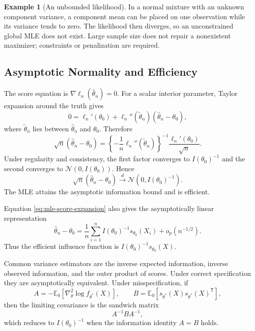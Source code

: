 \documentclass[12pt,oneside]{book}
\numberwithin{equation}{section}
\theoremstyle{definition}
\newtheorem{example}{Example}[section]
\theoremstyle{plain}
\theoremstyle{remark}
\newcommand{\E}{\mathbb{E}}
\newcommand{\convd}{\overset{d}{\to}}
\newcommand{\grad}{\nabla}
\newcommand{\Hess}{\nabla^2}
\newcommand{\Normal}{\mathcal{N}}
\begin{document}
\begin{example}[An unbounded likelihood]
In a normal mixture with an unknown component variance, a component mean can
be placed on one observation while its variance tends to zero.  The
likelihood then diverges, so an unconstrained global MLE does not exist.
Large sample size does not repair a nonexistent maximizer; constraints or
penalization are required.
\end{example}

\subsection{Asymptotic Normality and Efficiency}

The score equation is $\grad\ell_n(\widehat\theta_n)=0$.  For a scalar
interior parameter, Taylor expansion around the truth gives
\[
 0=\ell_n'(\theta_0)
   +\ell_n''(\widetilde\theta_n)(\widehat\theta_n-\theta_0),
\]
where $\widetilde\theta_n$ lies between $\widehat\theta_n$ and $\theta_0$.
Therefore
\begin{equation}
 \sqrt n(\widehat\theta_n-\theta_0)
 =\left\{-\frac1n\ell_n''(\widetilde\theta_n)\right\}^{-1}
   \frac{\ell_n'(\theta_0)}{\sqrt n}.
 \label{eq:mle-score-expansion}
\end{equation}
Under regularity and consistency, the first factor converges to
$I(\theta_0)^{-1}$ and the second converges to
$\Normal(0,I(\theta_0))$.  Hence
\begin{equation}
    \sqrt n(\widehat\theta_n-\theta_0)
    \convd\Normal(0,I(\theta_0)^{-1}).
    \label{eq:mle-asymptotic-normality}
\end{equation}
The MLE attains the asymptotic information bound and is efficient.

Equation \eqref{eq:mle-score-expansion} also gives the asymptotically linear
representation
\[
 \widehat\theta_n-\theta_0
 =\frac1n\sum_{i=1}^n
 I(\theta_0)^{-1}s_{\theta_0}(X_i)+o_p(n^{-1/2}).
\]
Thus the efficient influence function is
$I(\theta_0)^{-1}s_{\theta_0}(X)$.

Common variance estimators are the inverse expected information, inverse
observed information, and the outer product of scores.  Under correct
specification they are asymptotically equivalent.  Under misspecification,
if
\[
 A=-\E_0[\Hess_\theta\log f_{\theta^*}(X)],
 \qquad
 B=\E_0[s_{\theta^*}(X)s_{\theta^*}(X)^\mathsf T],
\]
then the limiting covariance is the sandwich matrix
\begin{equation}
    A^{-1}BA^{-1},
    \label{eq:sandwich-covariance}
\end{equation}
which reduces to $I(\theta_0)^{-1}$ when the information identity $A=B$
holds.
\end{document}
